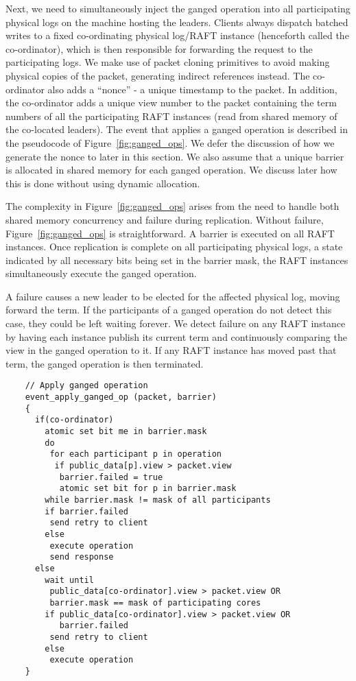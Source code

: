 \documentclass[twocolumn]{article}
\begin{document}
Next, we need to simultaneously inject the ganged operation into all
participating physical logs on the machine hosting the leaders. Clients always
dispatch batched writes to a fixed co-ordinating physical log/RAFT instance
(henceforth called the co-ordinator), which is then responsible for forwarding
the request to the participating logs. We make use of packet cloning primitives
to avoid making physical copies of the packet, generating indirect references
instead. The co-ordinator also adds a ``nonce'' - a unique timestamp to the
packet. In addition, the co-ordinator adds a unique view number to the packet
containing the term numbers of all the participating RAFT instances (read from
shared memory of the co-located leaders).  The event that applies a ganged
operation is described in the pseudocode of Figure~\ref{fig:ganged_ops}. We
defer the discussion of how we generate the nonce to later in this section. We
also assume that a unique barrier is allocated in shared memory for each ganged
operation. We discuss later how this is done without using dynamic allocation.

The complexity in Figure~\ref{fig:ganged_ops} arises from the need to handle
both shared memory concurrency and failure during replication. Without failure,
Figure~\ref{fig:ganged_ops} is straightforward. A barrier is executed on all
RAFT instances. Once replication is complete on all participating physical logs,
a state indicated by all necessary bits being set in the barrier mask, the RAFT
instances simultaneously execute the ganged operation.

A failure causes a new leader to be elected for the affected physical log,
moving forward the term. If the participants of a ganged operation do not
detect this case, they could be left waiting forever. We detect failure on any
RAFT instance by having each instance publish its current term and continuously
comparing the view in the ganged operation to it. If any RAFT instance has moved
past that term, the ganged operation is then terminated.

\begin{figure*}
  \centering
  \small
  \bf
\begin{verbatim}
    // Apply ganged operation
    event_apply_ganged_op (packet, barrier)
    {
      if(co-ordinator)
        atomic set bit me in barrier.mask         
        do
         for each participant p in operation
          if public_data[p].view > packet.view
           barrier.failed = true 
           atomic set bit for p in barrier.mask
        while barrier.mask != mask of all participants
        if barrier.failed
         send retry to client
        else       
         execute operation
         send response
      else
        wait until 
         public_data[co-ordinator].view > packet.view OR
         barrier.mask == mask of participating cores
        if public_data[co-ordinator].view > packet.view OR
           barrier.failed
         send retry to client
        else
         execute operation
    }
\end{verbatim}
\caption{Ganged Operation}
\label{fig:ganged_ops}
\end{figure*}
\end{document}
